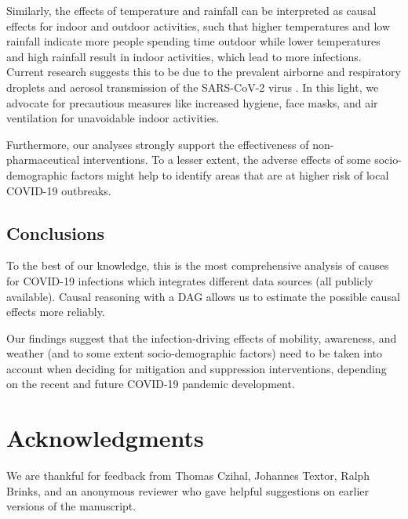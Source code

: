 \documentclass[]{elsarticle} %
\begin{document}
Similarly, the effects of temperature and rainfall can be interpreted as causal effects for indoor and outdoor activities, such that higher temperatures and low rainfall indicate more people spending time outdoor while lower temperatures and high rainfall result in indoor activities, which lead to more infections. Current research suggests this to be due to the prevalent airborne and respiratory droplets and aerosol transmission of the SARS-CoV-2 virus \citep{world2020transmission}. In this light, we advocate for precautious measures like increased hygiene, face masks, and air ventilation for unavoidable indoor activities.

Furthermore, our analyses strongly support the effectiveness of non-pharmaceutical interventions. To a lesser extent, the adverse effects of some socio-demographic factors might help to identify areas that are at higher risk of local COVID-19 outbreaks.

\hypertarget{conclusions}{%
\subsection{Conclusions}\label{conclusions}}

To the best of our knowledge, this is the most comprehensive analysis of causes for COVID-19 infections which integrates different data sources (all publicly available). Causal reasoning with a DAG allows us to estimate the possible causal effects more reliably.

Our findings suggest that the infection-driving effects of mobility, awareness, and weather (and to some extent socio-demographic factors) need to be taken into account when deciding for mitigation and suppression interventions, depending on the recent and future COVID-19 pandemic development.

\hypertarget{acknowledgments}{%
\section*{Acknowledgments}\label{acknowledgments}}

We are thankful for feedback from Thomas Czihal, Johannes Textor, Ralph Brinks, and an anonymous reviewer who gave helpful suggestions on earlier versions of the manuscript.

\renewcommand\refname{References}

\end{document}
